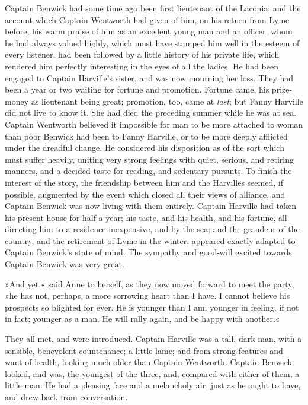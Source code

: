 Captain Benwick had some time ago been first lieutenant of the Laconia; and the account which Captain Wentworth had given of him, on his return from Lyme before, his warm praise of him as an excellent young man and an officer, whom he had always valued highly, which must have stamped him well in the esteem of every listener, had been followed by a little history of his private life, which rendered him perfectly interesting in the eyes of all the ladies. He had been engaged to Captain Harville's sister, and was now mourning her loss. They had been a year or two waiting for fortune and promotion. Fortune came, his prize-money as lieutenant being great; promotion, too, came at \textit{last}; but Fanny Harville did not live to know it. She had died the preceding summer while he was at sea. Captain Wentworth believed it impossible for man to be more attached to woman than poor Benwick had been to Fanny Harville, or to be more deeply afflicted under the dreadful change. He considered his disposition as of the sort which must suffer heavily, uniting very strong feelings with quiet, serious, and retiring manners, and a decided taste for reading, and sedentary pursuits. To finish the interest of the story, the friendship between him and the Harvilles seemed, if possible, augmented by the event which closed all their views of alliance, and Captain Benwick was now living with them entirely. Captain Harville had taken his present house for half a year; his taste, and his health, and his fortune, all directing him to a residence inexpensive, and by the sea; and the grandeur of the country, and the retirement of Lyme in the winter, appeared exactly adapted to Captain Benwick's state of mind. The sympathy and good-will excited towards Captain Benwick was very great.

»And yet,« said Anne to herself, as they now moved forward to meet the party, »he has not, perhaps, a more sorrowing heart than I have. I cannot believe his prospects so blighted for ever. He is younger than I am; younger in feeling, if not in fact; younger as a man. He will rally again, and be happy with another.«

They all met, and were introduced. Captain Harville was a tall, dark man, with a sensible, benevolent countenance; a little lame; and from strong features and want of health, looking much older than Captain Wentworth. Captain Benwick looked, and was, the youngest of the three, and, compared with either of them, a little man. He had a pleasing face and a melancholy air, just as he ought to have, and drew back from conversation.

